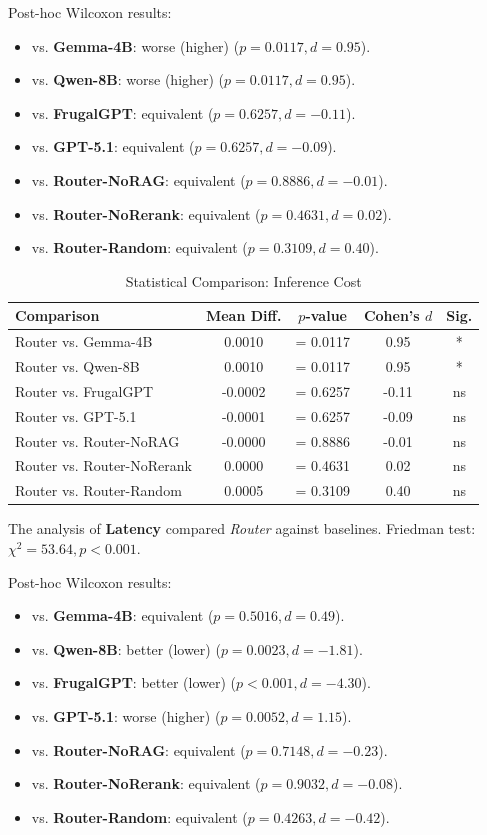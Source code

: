 Post-hoc Wilcoxon results:
\begin{itemize}
    \item vs. \textbf{Gemma-4B}: worse (higher) ($p = 0.0117, d=0.95$).
    \item vs. \textbf{Qwen-8B}: worse (higher) ($p = 0.0117, d=0.95$).
    \item vs. \textbf{FrugalGPT}: equivalent ($p = 0.6257, d=-0.11$).
    \item vs. \textbf{GPT-5.1}: equivalent ($p = 0.6257, d=-0.09$).
    \item vs. \textbf{Router-NoRAG}: equivalent ($p = 0.8886, d=-0.01$).
    \item vs. \textbf{Router-NoRerank}: equivalent ($p = 0.4631, d=0.02$).
    \item vs. \textbf{Router-Random}: equivalent ($p = 0.3109, d=0.40$).
\end{itemize}

\begin{table}[H]
\centering
\caption{Statistical Comparison: Inference Cost}
\label{tab:stats_inference}
\begin{tabular}{lcccc}
\toprule
\textbf{Comparison} & \textbf{Mean Diff.} & \textbf{$p$-value} & \textbf{Cohen's $d$} & \textbf{Sig.} \\ \midrule
Router vs. Gemma-4B & 0.0010 & = 0.0117 & 0.95 & * \\ 
Router vs. Qwen-8B & 0.0010 & = 0.0117 & 0.95 & * \\ 
Router vs. FrugalGPT & -0.0002 & = 0.6257 & -0.11 & ns \\ 
Router vs. GPT-5.1 & -0.0001 & = 0.6257 & -0.09 & ns \\ 
Router vs. Router-NoRAG & -0.0000 & = 0.8886 & -0.01 & ns \\ 
Router vs. Router-NoRerank & 0.0000 & = 0.4631 & 0.02 & ns \\ 
Router vs. Router-Random & 0.0005 & = 0.3109 & 0.40 & ns \\ 
\bottomrule
\end{tabular}
\end{table}


The analysis of \textbf{Latency} compared \textit{Router} against baselines. 
Friedman test: $\chi^2 = 53.64, p < 0.001$.

Post-hoc Wilcoxon results:
\begin{itemize}
    \item vs. \textbf{Gemma-4B}: equivalent ($p = 0.5016, d=0.49$).
    \item vs. \textbf{Qwen-8B}: better (lower) ($p = 0.0023, d=-1.81$).
    \item vs. \textbf{FrugalGPT}: better (lower) ($p < 0.001, d=-4.30$).
    \item vs. \textbf{GPT-5.1}: worse (higher) ($p = 0.0052, d=1.15$).
    \item vs. \textbf{Router-NoRAG}: equivalent ($p = 0.7148, d=-0.23$).
    \item vs. \textbf{Router-NoRerank}: equivalent ($p = 0.9032, d=-0.08$).
    \item vs. \textbf{Router-Random}: equivalent ($p = 0.4263, d=-0.42$).
\end{itemize}

